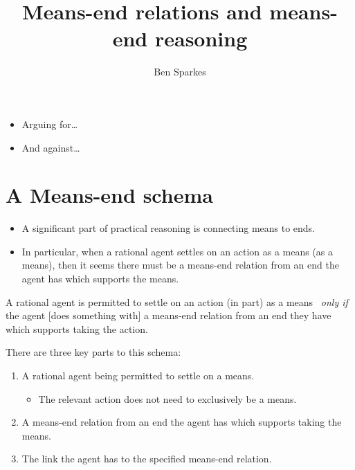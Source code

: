\documentclass[10pt]{article}
\title{Means-end relations and means-end reasoning}
\author{Ben Sparkes}
\newenvironment{beamerblock}[1]{%
  \tcolorbox[standard,%
  no shadow,
  noparskip,
  colback=white,
  colframe=black,
  colbacktitle=white,
  coltitle=black,
  colupper=black,
  size=small,
  boxrule=.125mm,
  fonttitle=\bfseries,
  sharp corners=all,
  title=#1]}%
{\endtcolorbox}
\newcommand{\hozlinedash}[0]{%
  \noindent\hdashrule[0.5ex][c]{\textwidth}{.1pt}{2.5pt}
}
\begin{document}

\maketitle

\tableofcontents


\hozlinedash

\begin{itemize}
\item Arguing for\dots
\item And against\dots
\end{itemize}

\hozlinedash


\newpage

\section{A Means-end schema}
\label{sec:means-end-schema}


\begin{itemize}
\item A significant part of practical reasoning is connecting means to ends.
\item In particular, when a rational agent settles on an action as a means (as a means), then it seems there must be a means-end relation from an end the agent has which supports the means.
\end{itemize}

\begin{beamerblock}{Means-end schema}
  A rational agent is permitted to settle on an action (in part) as a means
  \newline
  \mbox{ }\hfill\emph{only if}\hfill\mbox{ }
  \newline
  the agent [{does something with}] a means-end relation from an end they have which supports taking the action.
\end{beamerblock}

There are three key parts to this schema:
\begin{enumerate}[label=\arabic*., ref=(\arabic*)]
\item A rational agent being permitted to settle on a means.
  \begin{itemize}
  \item The relevant action does not need to exclusively be a means.
  \end{itemize}
\item A means-end relation from an end the agent has which supports taking the means.
\item The link the agent has to the specified means-end relation.
\end{enumerate}
\end{document}
